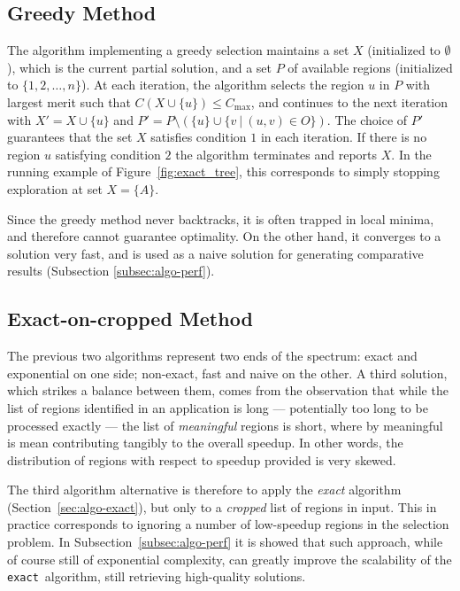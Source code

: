 \documentclass[]{usiinfthesis}
\newcommand{\exact}{\texttt{exact}}
\begin{document}
\subsection{Greedy Method}

The algorithm implementing a greedy selection maintains a set $X$
(initialized to $\emptyset$), which is the current partial solution,
and a set $P$ of available regions (initialized to $\{ 1, 2, \ldots, n
\}$). At each iteration, the algorithm selects the region $u$ in $P$
with largest merit such that $C(X\cup \{u\})\le C_{\max}$, and
continues to the next iteration with $X' = X\cup \{u\}$ and $P' =
P\setminus (\{u\}\cup\{ v\ |\ (u,v)\in O \})$. The choice of $P'$
guarantees that the set $X$ satisfies condition $1$ in each
iteration. If there is no region $u$ satisfying condition $2$ the
algorithm terminates and reports $X$.  In the running example of
Figure~\ref{fig:exact_tree}, this corresponds to simply stopping
exploration at set $X=\{A\}$.

Since the greedy method never backtracks, it is often trapped in local
minima, and therefore cannot guarantee optimality. On the other hand,
it converges to a solution very fast, and is used as a naive solution
for generating comparative results (Subsection \ref{subsec:algo-perf}).

\subsection{Exact-on-cropped Method}

The previous two algorithms represent two ends of the spectrum: exact
and exponential on one side; non-exact, fast and naive on the other.
A third solution, which strikes a balance between them, comes from the
observation that while the list of regions identified in an
application is long --- potentially too long to be processed exactly
--- the list of \emph{meaningful} regions is short, where by
meaningful is mean contributing tangibly to the overall speedup. In
other words, the distribution of regions with respect to speedup
provided is very skewed.

The third algorithm alternative is therefore to apply the \emph{exact}
algorithm (Section~\ref{sec:algo-exact}), but only to a \emph{cropped}
list of regions in input. This in practice corresponds to ignoring a
number of low-speedup regions in the selection problem. In
Subsection~\ref{subsec:algo-perf} it is showed that such approach, while of
course still of exponential complexity, can greatly improve the
scalability of the \exact\ algorithm, still retrieving high-quality
solutions.
\end{document}
